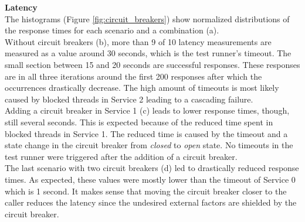 \noindent
\textbf{Latency} \\
 The histograms (Figure \ref{fig:circuit_breakers}) show normalized distributions of the response times for each scenario and a combination (a). \\
 
\noindent
Without circuit breakers (b), more than 9 of 10 latency measurements are measured as a value around 30 seconds, which is the test runner's timeout. The small section between 15 and 20 seconds are successful responses. These responses are in all three iterations around the first 200 responses after which the occurrences drastically decrease. The high amount of timeouts is most likely caused by blocked threads in Service 2 leading to a cascading failure. \\
 
 \noindent
Adding a circuit breaker in Service 1 (c) leads to lower response times, though, still several seconds. This is expected because of the reduced time spent in blocked threads in Service 1. The reduced time is caused by the timeout and a state change in the circuit breaker from \textit{closed} to \textit{open} state. No timeouts in the test runner were triggered after the addition of a circuit breaker.\\
 
\noindent The last scenario with two circuit breakers (d) led to drastically reduced response times. As expected, these values were mostly lower than the timeout of Service 0 which is 1 second. It makes sense that moving the circuit breaker closer to the caller reduces the latency since the undesired external factors are shielded by the circuit breaker.
 

